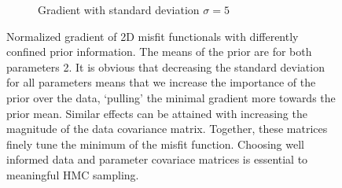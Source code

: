 \begin{figure}
\begin{subfigure}{.5\textwidth}
		\caption{Gradient with standard deviation $\sigma = 5$}
		\label{fig:linear_system.prior_influence.wide}
	\end{subfigure}
	\caption{Normalized gradient of 2D misfit functionals with differently confined prior information. The means of the prior are for both parameters 2. It is obvious that decreasing the standard deviation for all parameters means that we increase the importance of the prior over the data, `pulling' the minimal gradient more towards the prior mean. Similar effects can be attained with increasing the magnitude of the data covariance matrix. Together, these matrices finely tune the minimum of the misfit function. Choosing well informed data and parameter covariace matrices is essential to meaningful \gls{HMC} sampling.}
	\label{fig:linear_system.prior_influence}
\end{figure}

